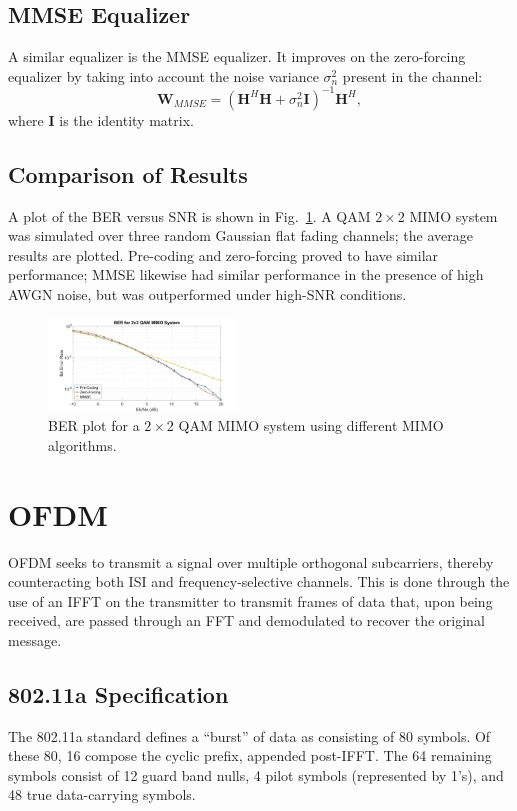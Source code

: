 \documentclass[journal]{IEEEtran}
\begin{document}
\subsection{MMSE Equalizer}
A similar equalizer is the MMSE equalizer. It improves on the zero-forcing equalizer by taking into account the noise variance $\sigma^2_n$ present in the channel:
\begin{equation}
\mathbf{W}_{MMSE} = (\mathbf{H}^H \mathbf{H} + \sigma^2_n\mathbf{I})^{-1}\mathbf{H}^H,
\end{equation}
where $\mathbf{I}$ is the identity matrix.

\subsection{Comparison of Results}
A plot of the BER versus SNR is shown in Fig.~\ref{fig:mimo_res}. A QAM $2\times2$ MIMO system was simulated over three random Gaussian flat fading channels; the average results are plotted. Pre-coding and zero-forcing proved to have similar performance; MMSE likewise had similar performance in the presence of high AWGN noise, but  was outperformed under high-SNR conditions.

\begin{figure}[!htbp]
    \centering
    \includegraphics[width = 0.45\textwidth]{MIMO.jpg}
    \caption{BER plot for a $2\times2$ QAM MIMO system using different MIMO algorithms.}
    \label{fig:mimo_res}
\end{figure}

\section{OFDM} \label{sec:OFDM}
OFDM seeks to transmit a signal over multiple orthogonal subcarriers, thereby counteracting both ISI and frequency-selective channels. This is done through the use of an IFFT on the transmitter to transmit frames of data that, upon being received, are passed through an FFT and demodulated to recover the original message.

\subsection{802.11a Specification}
The 802.11a standard defines a ``burst'' of data as consisting of 80 symbols. Of these 80, 16 compose the cyclic prefix, appended post-IFFT. The 64 remaining symbols consist of 12 guard band nulls, 4 pilot symbols (represented by 1's), and 48 true data-carrying symbols. 
\end{document}
